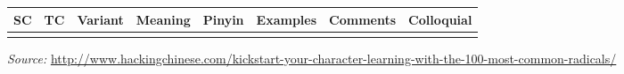 \documentclass[fontsize=12pt,
			 parskip=full,
			 a4paper,
			 landscape,
			 pagesize,
			 DIV=12]{scrreprt}
\begin{document}
\begin{longtable}{|>{\large}c|>{\large}c|>{\large}c|p{3cm}|p{1.5cm}|>{\large}l|p{7cm}|p{2.5cm}|}
\hline
\normalsize\bfseries SC & \normalsize\bfseries TC & \normalsize\bfseries Variant & \bfseries Meaning & \bfseries Pinyin & \normalsize\bfseries Examples & \bfseries Comments & \bfseries Colloquial \\ \hline
\endhead
\hline
\endfoot

\end{longtable}
{\em Source:} \url{http://www.hackingchinese.com/kickstart-your-character-learning-with-the-100-most-common-radicals/}
\end{document}
